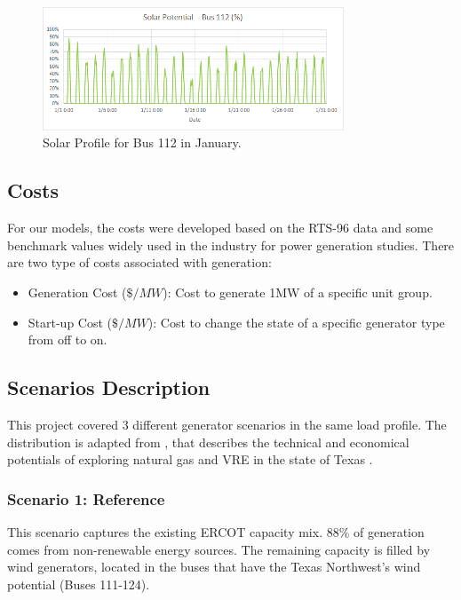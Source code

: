 \documentclass[12pt,LUDisStyle,twosided]{book}
\begin{document}
\begin{figure}[H] 
	\begin{center}
		\includegraphics[width=0.8\textwidth,keepaspectratio]{solarPotentialBus112.png}
	  	\caption{Solar Profile for Bus 112 in January.}
     	\label{fig:solarProfileBus112January}
	\end{center}
\end{figure}


\subsection{Costs}

For our models, the costs were developed based on the RTS-96 data and some benchmark values widely used in the industry for power generation studies. There are two type of costs associated with generation:

\begin{itemize}
\item Generation Cost ($\$/MW$): Cost to generate 1MW of a specific unit group.
\item Start-up Cost ($\$/MW$): Cost to change the state of a specific generator type from off to on.
\end{itemize}

\subsection{Scenarios Description} \label{section:ScenarioDesc}

This project covered 3 different generator scenarios in the same load profile. The distribution is adapted from \citeauthor{shavel} \cite{shavel}, that describes the technical and economical potentials of exploring natural gas and VRE in the state of Texas \cite{shavel}. 

\subsubsection{Scenario 1: Reference}

This scenario captures the existing ERCOT capacity mix. 88\% of generation comes from non-renewable energy sources. The remaining capacity is filled by wind generators, located in the buses that have the Texas Northwest's wind potential (Buses 111-124).
\end{document}
